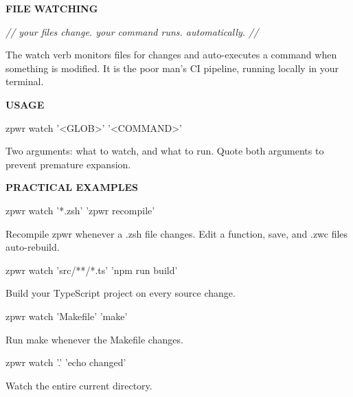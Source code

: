 \documentclass[11pt,a4paper,twoside]{book}
\begin{document}
\vspace{10pt}
{\large\bfseries\color{neoncyan} FILE WATCHING}\vspace{6pt}

{\small\itshape\color{dimtext} // your files change. your command runs. automatically. //}

The watch verb monitors files for changes and auto-executes a command when something is modified. It is the poor man's CI pipeline, running locally in your terminal.


\vspace{12pt}
{\bfseries\color{neonyellow} USAGE}\vspace{4pt}

\begin{codebox}
\color{neongreen}zpwr watch '<GLOB>' '<COMMAND>'\\
\end{codebox}

Two arguments: what to watch, and what to run. Quote both arguments to prevent premature expansion.


\vspace{12pt}
{\bfseries\color{neonyellow} PRACTICAL EXAMPLES}\vspace{4pt}

\begin{codebox}
\color{neongreen}zpwr watch '*.zsh' 'zpwr recompile'\\
\end{codebox}

Recompile zpwr whenever a .zsh file changes. Edit a function, save, and .zwc files auto-rebuild.

\begin{codebox}
\color{neongreen}zpwr watch 'src/**/*.ts' 'npm run build'\\
\end{codebox}

Build your TypeScript project on every source change.

\begin{codebox}
\color{neongreen}zpwr watch 'Makefile' 'make'\\
\end{codebox}

Run make whenever the Makefile changes.

\begin{codebox}
\color{neongreen}zpwr watch '.' 'echo changed'\\
\end{codebox}

Watch the entire current directory.
\end{document}
